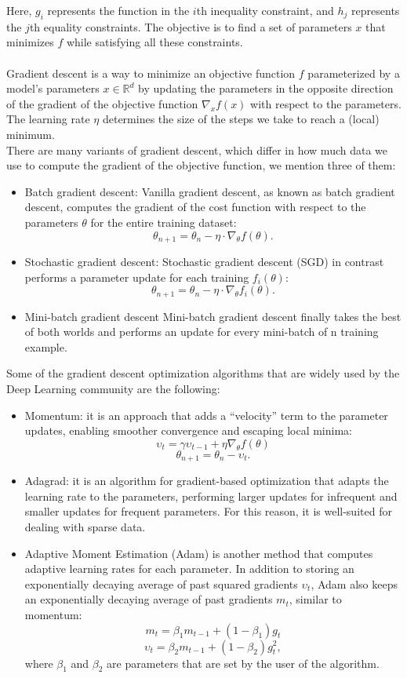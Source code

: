 \documentclass{article}
\begin{document}
Here, $g_i$ represents the function in the $i$th inequality constraint, and $h_j$ represents the $j$th equality constraints. The objective is to find a set of parameters $x$ that minimizes $f$ while satisfying all these constraints.\\
\\
Gradient descent is a way to minimize an objective function $f$ parameterized by a model’s
parameters $x\in\mathbb{R}^d$ by updating the parameters in the opposite direction of the gradient of the
objective function $\nabla_xf(x)$ with respect to the parameters. The learning rate $\eta$ determines the size of the
steps we take to reach a (local) minimum.\\
There are many variants of gradient descent, which differ in how much data we use to compute the
gradient of the objective function, we mention three of them:
\begin{itemize}
    \item Batch gradient descent: Vanilla gradient descent, as known as batch gradient descent, computes the gradient of the cost function with respect
to the parameters $\theta$ for the entire training dataset:
\[\theta_{n+1}=\theta_n-\eta\cdot\nabla_\theta f(\theta).\]
\item Stochastic gradient descent: Stochastic gradient descent (SGD) in contrast performs a parameter update for each training $f_i(\theta)$:
\[\theta_{n+1}=\theta_n-\eta\cdot\nabla_\theta f_i(\theta).\]
\item Mini-batch gradient descent
Mini-batch gradient descent finally takes the best of both worlds and performs an update for every
mini-batch of n training example.
\end{itemize}

Some of the gradient descent optimization algorithms that are widely used by the Deep Learning community are the following:
\begin{itemize}
    \item Momentum: it is an approach that adds a \enquote{velocity} term to the parameter updates, enabling smoother convergence and escaping local minima:
\[ \upsilon_t=\gamma\upsilon_{t-1}+\eta\nabla_\theta f(\theta)\]
      \[  \theta_{n+1}=\theta_n-\upsilon_t.\]
\item Adagrad: it is an algorithm for gradient-based optimization that adapts the learning
rate to the parameters, performing larger updates for infrequent and smaller updates for frequent
parameters. For this reason, it is well-suited for dealing with sparse data.
\item Adaptive Moment Estimation (Adam) is another method that computes adaptive learning rates
for each parameter. In addition to storing an exponentially decaying average of past squared gradients
$\upsilon_t$, Adam also keeps an exponentially decaying average of past gradients
$m_t$, similar to momentum:
\[m_t=\beta_1m_{t-1}+(1-\beta_1)g_t\]
\[\upsilon_t=\beta_2m_{t-1}+(1-\beta_2)g^2_t,\]
where $\beta_1$ and $\beta_2$ are parameters that are set by the user of the algorithm.
\end{itemize}
\end{document}
